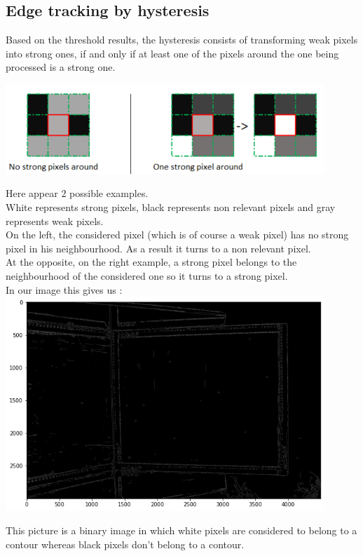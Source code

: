 \documentclass{article}
\begin{document}
\subsection{Edge tracking by hysteresis}
Based on the threshold results, the hysteresis consists of transforming weak pixels into strong ones, if and only if at least one of the pixels around the one being processed is a strong one.
\vspace{1 cm}

\includegraphics[width=12cm]{images/img10.png}

Here appear $2$ possible examples.\\
White represents strong pixels, black represents non relevant pixels and gray represents weak pixels. \\
On the left, the considered pixel (which is of course a weak pixel) has no strong pixel in his neighbourhood. As a result it turns to a non relevant pixel.\\
At the opposite, on the right example, a strong pixel belongs to the neighbourhood of the considered one so it turns to a strong pixel.\\

In our image this gives us :\\
\includegraphics[width=12cm]{images/img11.png}

This picture is a binary image in which white pixels are considered to belong to a contour whereas black pixels don't belong to a contour.
\end{document}
